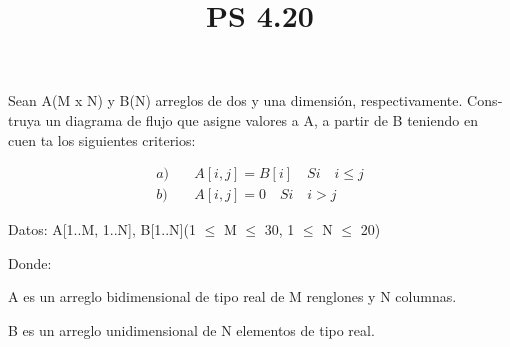 \documentclass[11pt]{amsart}
\title{PS 4.20}
\begin{document}
\maketitle

\noindent Sean A(M x N) y B(N) arreglos de dos y una dimensión, respectivamente. Cons­ truya un diagrama de flujo que asigne valores a A, a partir de B teniendo en cuen­ ta los siguientes criterios:

\[
\begin{aligned}
a) &\quad A[i,j] = B[i]  \quad Si \quad i \leq j \\
b) &\quad A[i,j] = 0 \quad Si \quad i > j 
\end{aligned}
\]
\newline


\noindent Datos: A[1..M, 1..N], B[1..N]\quad  (1 $\leq$ M $\leq$ 30, 1 $\leq$ N $\leq$ 20)
\newline

\noindent Donde:
\newline

\noindent A es un arreglo bidimensional de tipo real de M renglones y N co­lumnas.

\noindent B es un arreglo unidimensional de N elementos de tipo real.
\end{document}
